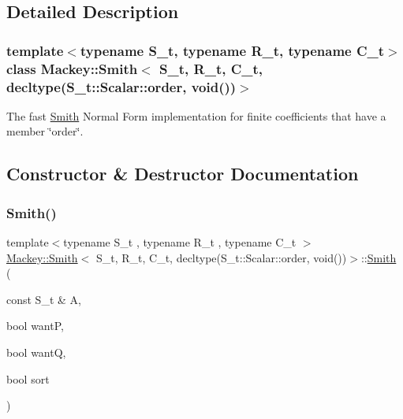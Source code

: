 \subsection{Detailed Description}
\subsubsection*{template$<$typename S\+\_\+t, typename R\+\_\+t, typename C\+\_\+t$>$\newline
class Mackey\+::\+Smith$<$ S\+\_\+t, R\+\_\+t, C\+\_\+t, decltype(\+S\+\_\+t\+::\+Scalar\+::order, void())$>$}

The fast \hyperlink{classMackey_1_1Smith}{Smith} Normal Form implementation for finite coefficients that have a member \char`\"{}order\char`\"{}. 

\subsection{Constructor \& Destructor Documentation}
\mbox{\label{classMackey_1_1Smith_3_01S__t_00_01R__t_00_01C__t_00_01decltype_07S__t_1_1Scalar_1_1order_00_01void_07_08_08_4_a248f8208745c2cddd880a40694a6a64c}} 
\subsubsection{\texorpdfstring{Smith()}{Smith()}\hspace{0.1cm}{\footnotesize\ttfamily [1/2]}}
{\footnotesize\ttfamily template$<$typename S\+\_\+t , typename R\+\_\+t , typename C\+\_\+t $>$ \\
\hyperlink{classMackey_1_1Smith}{Mackey\+::\+Smith}$<$ S\+\_\+t, R\+\_\+t, C\+\_\+t, decltype(S\+\_\+t\+::\+Scalar\+::order, void())$>$\+::\hyperlink{classMackey_1_1Smith}{Smith} (\begin{DoxyParamCaption}\item[{const S\+\_\+t \&}]{A,  }\item[{bool}]{wantP,  }\item[{bool}]{wantQ,  }\item[{bool}]{sort }\end{DoxyParamCaption})\hspace{0.3cm}{\ttfamily [inline]}}



